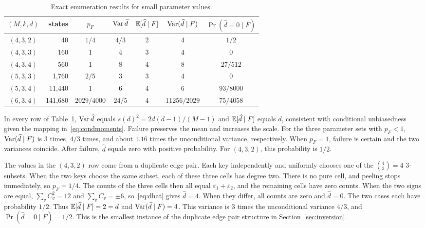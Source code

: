 \begin{table}[!htbp]
\centering
\caption{Exact enumeration results for small parameter values.}
\label{tab:exact}
\begin{tabular}{@{}crccccc@{}}
\toprule
$(M,k,d)$ & states & $p_F$ & $\operatorname{Var}\widehat d$ & $\mathbb E[\widehat d\mid F]$ & $\operatorname{Var}(\widehat d\mid F)$ & $\Pr(\widehat d=0\mid F)$\\
\midrule
$(4,3,2)$ & 40 & $1/4$ & $4/3$ & 2 & 4 & $1/2$\\
$(4,3,3)$ & 160 & 1 & 4 & 3 & 4 & 0\\
$(4,3,4)$ & 560 & 1 & 8 & 4 & 8 & $27/512$\\
$(5,3,3)$ & 1,760 & $2/5$ & 3 & 3 & 4 & 0\\
$(5,3,4)$ & 11,440 & 1 & 6 & 4 & 6 & $93/8000$\\
$(6,3,4)$ & 141,680 & $2029/4000$ & $24/5$ & 4 & $11256/2029$ & $75/4058$\\
\bottomrule
\end{tabular}
\end{table}

In every row of Table~\ref{tab:exact}, $\operatorname{Var}\widehat d$ equals $s(d)^2=2d(d-1)/(M-1)$ and $\mathbb E[\widehat d\mid F]$ equals $d$, consistent with conditional unbiasedness given the mapping in~\eqref{eq:condmoments}. Failure preserves the mean and increases the scale. For the three parameter sets with $p_F<1$, $\operatorname{Var}(\widehat d\mid F)$ is $3$ times, $4/3$ times, and about $1.16$ times the unconditional variance, respectively. When $p_F=1$, failure is certain and the two variances coincide. After failure, $\widehat d$ equals zero with positive probability. For $(4,3,2)$, this probability is $1/2$.

The values in the $(4,3,2)$ row come from a duplicate edge pair. Each key independently and uniformly chooses one of the $\binom43=4$ $3$-subsets. When the two keys choose the same subset, each of these three cells has degree two. There is no pure cell, and peeling stops immediately, so $p_F=1/4$. The counts of the three cells then all equal $\varepsilon_1+\varepsilon_2$, and the remaining cells have zero counts. When the two signs are equal, $\sum_vC_v^2=12$ and $\sum_vC_v=\pm6$, so~\eqref{eq:dhat} gives $\widehat d=4$. When they differ, all counts are zero and $\widehat d=0$. The two cases each have probability $1/2$. Thus $\mathbb E[\widehat d\mid F]=2=d$ and $\operatorname{Var}(\widehat d\mid F)=4$. This variance is $3$ times the unconditional variance $4/3$, and $\Pr(\widehat d=0\mid F)=1/2$. This is the smallest instance of the duplicate edge pair structure in Section~\ref{sec:inversion}.


